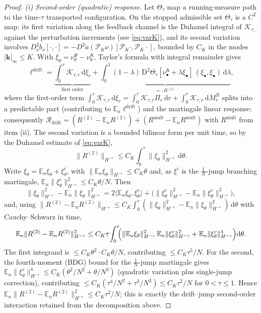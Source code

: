 \documentclass[a4paper,fleqn]{cas-sc}
\theoremstyle{definition}
\theoremstyle{remark}
\begin{document}
\begin{proof}
\emph{(i) Second-order (quadratic) response.} Let $\Theta_\tau$ map a running-measure
path to the time-$\tau$ transported configuration. On the stopped admissible set
$\Theta_\tau$ is a $C^2$ map: its first variation along the feedback channel is the
Duhamel integral of $\mathcal K_{\tau,\cdot}$ against the perturbation increments
(see \eqref{eq:varK}), and its second variation involves
$D^2_\nu b_\nu[\cdot,\cdot]=-D^2\tilde a(\mathcal P_K\nu)[\mathcal P_K\cdot,\mathcal P_K\cdot]$,
bounded by $C_K$ in the modes $|\mathbf k|_\infty\le K$. With
$\xi_\theta=\nu^\Phi_\theta-\nu^{\mathsf A}_\theta$, Taylor's formula with integral
remainder gives
\[
\ell^{\mathrm{drift}}
=\underbrace{\int_0^\tau\mathcal K_{\tau,r}\,\mathrm d\xi_r}_{\text{first order}}
+\underbrace{\int_0^1(1-\lambda)\,\mathrm D^2\Theta_\tau[\nu^{\mathsf A}_\bullet+\lambda\xi_\bullet]\,(\xi_\bullet,\xi_\bullet)\,\mathrm d\lambda}_{=:R^{(2)}},
\]
where the first-order term
$\int_0^\tau\mathcal K_{\tau,r}\,\mathrm d\xi_r=\int_0^\tau\mathcal K_{\tau,r}\Pi_r\,\mathrm dr+\int_0^\tau\mathcal K_{\tau,r}\,\mathrm dM^B_r$
splits into a predictable part (contributing to $\mathbb E_n\ell^{\mathrm{drift}}$) and
the martingale linear response; consequently
$\mathcal R_{\mathrm{drift}}=(R^{(2)}-\mathbb E_nR^{(2)})+(R^{\mathrm{mult}}-\mathbb E_nR^{\mathrm{mult}})$
with $R^{\mathrm{mult}}$ from item (ii). The second variation is a bounded bilinear
form per unit time, so by the Duhamel estimate of \eqref{eq:varK},
\[
\|R^{(2)}\|_{H^{-s}}\le C_K\int_0^\tau\|\xi_\theta\|_{H^{-s}}^2\,\mathrm d\theta .
\]
Write $\xi_\theta=\mathbb E_n\xi_\theta+\xi_\theta^c$, with
$\|\mathbb E_n\xi_\theta\|_{H^{-s}}\le C_K\theta$ and, as $\xi^c$ is the
$\tfrac1N$-jump branching martingale, $\mathbb E_n\|\xi_\theta^c\|_{H^{-s}}^2\le C_K\theta/N$.
Then
\[
\|\xi_\theta\|_{H^{-s}}^2-\mathbb E_n\|\xi_\theta\|_{H^{-s}}^2
=2\langle\mathbb E_n\xi_\theta,\xi_\theta^c\rangle
+\bigl(\|\xi_\theta^c\|_{H^{-s}}^2-\mathbb E_n\|\xi_\theta^c\|_{H^{-s}}^2\bigr),
\]
and, using $\|R^{(2)}-\mathbb E_nR^{(2)}\|_{H^{-s}}\le C_K\int_0^\tau(\|\xi_\theta\|_{H^{-s}}^2-\mathbb E_n\|\xi_\theta\|_{H^{-s}}^2)\,\mathrm d\theta$
with Cauchy--Schwarz in time,
\[
\mathbb E_n\|R^{(2)}-\mathbb E_nR^{(2)}\|_{H^{-s}}^2
\le C_K\tau\!\int_0^\tau\!\!\Bigl(\|\mathbb E_n\xi_\theta\|_{H^{-s}}^2\,\mathbb E_n\|\xi_\theta^c\|_{H^{-s}}^2
+\mathbb E_n\|\xi_\theta^c\|_{H^{-s}}^4\Bigr)\mathrm d\theta .
\]
The first integrand is $\le C_K\theta^2\cdot C_K\theta/N$, contributing $\le C_K\tau^5/N$.
For the second, the fourth-moment (BDG) bound for the $\tfrac1N$-jump martingale gives
$\mathbb E_n\|\xi_\theta^c\|_{H^{-s}}^4\le C_K(\theta^2/N^2+\theta/N^3)$ (quadratic
variation plus single-jump correction), contributing
$\le C_K(\tau^4/N^2+\tau^3/N^3)\le C_K\tau^2/N$ for $0<\tau\le1$. Hence
$\mathbb E_n\|R^{(2)}-\mathbb E_nR^{(2)}\|_{H^{-s}}^2\le C_K\tau^2/N$; this is exactly the
drift--jump second-order interaction retained from the decomposition above.


\end{proof}
\end{document}
